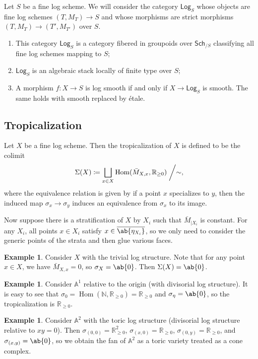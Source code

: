 \documentclass{amsart}
\theoremstyle{definition}
\newtheorem{exm}[thm]{Example}
\theoremstyle{remark}
\theoremstyle{plain}
\theoremstyle{definition}
\theoremstyle{remark}
\newcommand{\A}{\mathbb{A}}
\newcommand{\N}{\mathbb{N}}
\newcommand{\R}{\mathbb{R}}
\newcommand{\ms}[1]{\mathsf{#1}}
\newcommand{\ol}[1]{\overline{#1}}
\newcommand{\1}{\mathbf{1}}
\newcommand{\2}{\mathbf{2}}
\newcommand{\3}{\mathbf{3}}
\DeclareMathOperator{\Hom}{Hom}
\begin{document}
Let \(S\) be a fine log scheme. We will consider the category \(\ms{Log}_S\) whose objects are fine log schemes \((T, M_T) \to S\) and whose morphisms are strict morphisms \((T, M_T) \to (T', M_{T'})\) over \(S\).
\begin{enumerate}
    \item This category \(\ms{Log}_S\) is a category fibered in groupoids over \(\ms{Sch}_{/S}\) classifying all fine log schemes mapping to \(S\);
    \item \(\ms{Log}_S\) is an algebraic stack locally of finite type over \(S\);
    \item A morphism \(f \colon X \to S\) is log smooth if and only if \(X \to \ms{Log}_S\) is smooth. The same holds with smooth replaced by \'etale.
\end{enumerate}

\subsection{Tropicalization}%
\label{sub:Tropicalization}

Let \(X\) be a fine log scheme. Then the tropicalization of \(X\) is defined to be the colimit
\[\Sigma(X) \coloneqq \bigsqcup_{x \in X} \Hom(\bar{M}_{X,x}, \R_{\geq 0}) \biggm/ \sim, \]
where the equivalence relation is given by if a point \(x\) specializes to \(y\), then the induced map \(\sigma_x \to \sigma_y\) induces an equivalence from \(\sigma_x\) to its image. 

Now suppose there is a stratification of \(X\) by \(X_i\) such that \(\bar{M}_{|X_i}\) is constant. For any \(X_i\), all points \(x \in X_i\) satisfy \(x \in \ol{\ab\{\eta_{X_i}\}}\), so we only need to consider the generic points of the strata and then glue various faces. 

\begin{exm}
    Consider \(X\) with the trivial log structure. Note that for any point \(x \in X\), we have \(\bar{M}_{X,x} = 0\), so \(\sigma_X = \ab\{0\}\). Then \(\Sigma(X) = \ab\{0\}\).
\end{exm}

\begin{exm}
    Consider \(\A^1\) relative to the origin (with divisorial log structure). It is easy to see that \(\sigma_0 = \Hom(\N, \R_{\geq 0}) = \R_{\geq 0}\) and \(\sigma_{\eta} = \ab\{0\}\), so the tropicalization is \(\R_{\geq 0}\).
\end{exm}

\begin{exm}
    Consider \(\A^2\) with the toric log structure (divisorial log structure relative to \(xy = 0\)). Then \(\sigma_{(0,0)} = \R^2_{\geq 0}\), \(\sigma_{(x,0)} = \R_{\geq 0}\), \(\sigma_{(0,y)} = \R_{\geq 0}\), and \(\sigma_{(x,y)} = \ab\{0\}\), so we obtain the fan of \(\A^2\) as a toric variety treated as a cone complex.
\end{exm}
\end{document}
